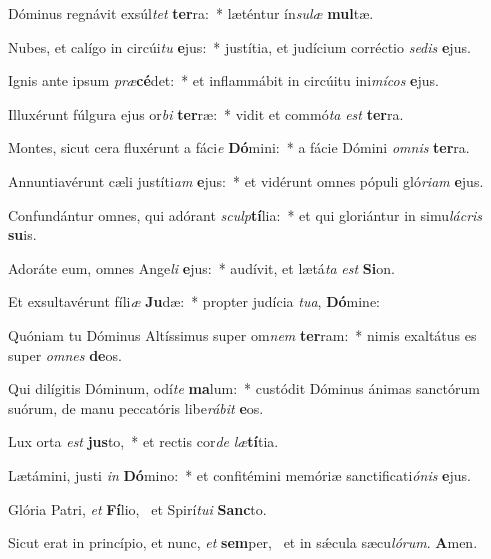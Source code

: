 \item Dóminus regnávit exsúl\textit{tet} \textbf{ter}ra:~* læténtur ín\textit{su}\textit{læ} \textbf{mul}tæ.
\item Nubes, et calígo in circúi\textit{tu} \textbf{e}jus:~* justítia, et judícium corréctio \textit{se}\textit{dis} \textbf{e}jus.
\item Ignis ante ipsum \textit{præ}\textbf{cé}det:~* et inflammábit in circúitu ini\textit{mí}\textit{cos} \textbf{e}jus.
\item Illuxérunt fúlgura ejus or\textit{bi} \textbf{ter}ræ:~* vidit et commó\textit{ta} \textit{est} \textbf{ter}ra.
\item Montes, sicut cera fluxérunt a fáci\textit{e} \textbf{Dó}mini:~* a fácie Dómini \textit{om}\textit{nis} \textbf{ter}ra.
\item Annuntiavérunt cæli justíti\textit{am} \textbf{e}jus:~* et vidérunt omnes pópuli gló\textit{ri}\textit{am} \textbf{e}jus.
\item Confundántur omnes, qui adórant \textit{sculp}\textbf{tí}lia:~* et qui gloriántur in simu\textit{lá}\textit{cris} \textbf{su}is.
\item Adoráte eum, omnes Ange\textit{li} \textbf{e}jus:~* audívit, et lætá\textit{ta} \textit{est} \textbf{Si}on.
\item Et exsultavérunt fíli\textit{æ} \textbf{Ju}dæ:~* propter judícia \textit{tu}\textit{a}, \textbf{Dó}mine:
\item Quóniam tu Dóminus Altíssimus super om\textit{nem} \textbf{ter}ram:~* nimis exaltátus es super \textit{om}\textit{nes} \textbf{de}os.
\item Qui dilígitis Dóminum, odí\textit{te} \textbf{ma}lum:~* custódit Dóminus ánimas sanctórum suórum, de manu peccatóris libe\textit{rá}\textit{bit} \textbf{e}os.
\item Lux orta \textit{est} \textbf{jus}to,~* et rectis cor\textit{de} \textit{læ}\textbf{tí}tia.
\item Lætámini, justi \textit{in} \textbf{Dó}mino:~* et confitémini memóriæ sanctificati\textit{ó}\textit{nis} \textbf{e}jus.
\item Glória Patri, \textit{et} \textbf{Fí}lio,~\psstar{} et Spirí\textit{tu}\textit{i} \textbf{Sanc}to.
\item Sicut erat in princípio, et nunc, \textit{et} \textbf{sem}per,~\psstar{} et in sǽcula sæcu\textit{ló}\textit{rum}. \textbf{A}men.